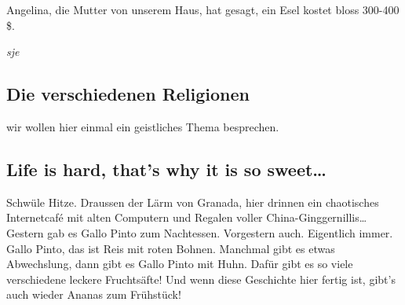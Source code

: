 \documentclass[
]{article}
\begin{document}
Angelina, die Mutter von unserem Haus, hat gesagt, ein Esel kostet bloss
300-400 \$.

\emph{sje}

\hypertarget{die-verschiedenen-religionen}{%
\subsection{Die verschiedenen
Religionen}\label{die-verschiedenen-religionen}}

wir wollen hier einmal ein geistliches Thema besprechen.

\hypertarget{life-is-hard-thats-why-it-is-so-sweet}{%
\subsection{Life is hard, that's why it is so
sweet\ldots{}}\label{life-is-hard-thats-why-it-is-so-sweet}}

Schwüle Hitze. Draussen der Lärm von Granada, hier drinnen ein
chaotisches Internetcafé mit alten Computern und Regalen voller
China-Ginggernillis\ldots{} Gestern gab es Gallo Pinto zum Nachtessen.
Vorgestern auch. Eigentlich immer. Gallo Pinto, das ist Reis mit roten
Bohnen. Manchmal gibt es etwas Abwechslung, dann gibt es Gallo Pinto mit
Huhn. Dafür gibt es so viele verschiedene leckere Fruchtsäfte! Und wenn
diese Geschichte hier fertig ist, gibt's auch wieder Ananas zum
Frühstück!
\end{document}
